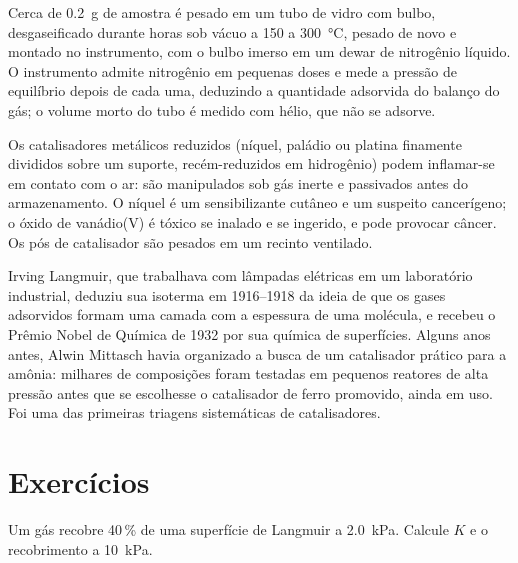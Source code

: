 \begin{inthelab}
Cerca de \qty{0.2}{g} de amostra é pesado em um tubo de vidro com bulbo, desgaseificado
durante horas sob vácuo a 150 a \qty{300}{\celsius}, pesado de novo e montado no
instrumento, com o bulbo imerso em um dewar de nitrogênio líquido. O instrumento
admite nitrogênio em pequenas doses e mede a pressão de equilíbrio depois de cada
uma, deduzindo a quantidade adsorvida do balanço do gás; o volume morto do tubo é
medido com hélio, que não se adsorve.
\end{inthelab}

\begin{safety}{}
Os catalisadores metálicos reduzidos (níquel, paládio ou platina finamente divididos
sobre um suporte, recém-reduzidos em hidrogênio) podem inflamar-se em contato com o
ar: são manipulados sob gás inerte e passivados antes do armazenamento. O níquel é
um sensibilizante cutâneo e um suspeito cancerígeno; o óxido de vanádio(V) é tóxico
se inalado e se ingerido, e pode provocar câncer. Os pós de catalisador são pesados
em um recinto ventilado.
\end{safety}

\begin{history}
Irving Langmuir, que trabalhava com lâmpadas elétricas em um laboratório
industrial, deduziu sua isoterma em 1916--1918 da ideia de que os gases adsorvidos
formam uma camada com a espessura de uma molécula, e recebeu o Prêmio Nobel de
Química de 1932 por sua química de superfícies. Alguns anos antes, Alwin Mittasch
havia organizado a busca de um catalisador prático para a amônia: milhares de
composições foram testadas em pequenos reatores de alta pressão antes que se
escolhesse o catalisador de ferro promovido, ainda em uso. Foi uma das primeiras
triagens sistemáticas de catalisadores.
\end{history}

\section{Exercícios}

\begin{exercise}[$\star$]\label{exo:b3:surfaces-catalysis:1}
Um gás recobre 40\,\% de uma superfície de Langmuir a \qty{2.0}{kPa}. Calcule $K$ e o
recobrimento a \qty{10}{kPa}.
\end{exercise}

